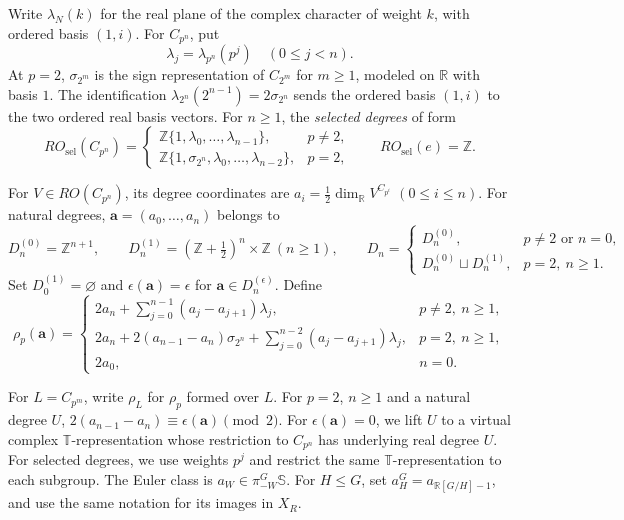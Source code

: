 Write $\lambda_N(k)$ for the real plane of the complex character
of weight $k$, with ordered basis $(1,i)$. For $C_{p^n}$, put
\[
\lambda_j=\lambda_{p^n}(p^j)\quad(0\le j<n).
\]
At $p=2$, $\sigma_{2^m}$ is the sign representation of $C_{2^m}$
for $m\ge1$, modeled on $\mathbb R$ with basis $1$.
The identification $\lambda_{2^n}(2^{n-1})=2\sigma_{2^n}$ sends
the ordered basis $(1,i)$ to the two ordered real basis vectors.
For $n\ge1$, the \emph{selected degrees} of \cite{ZhangHZ} form
\[
RO_{\mathrm{sel}}(C_{p^n})=
\begin{cases}
\mathbb Z\{1,\lambda_0,\ldots,\lambda_{n-1}\},&p\ne2,\\
\mathbb Z\{1,\sigma_{2^n},\lambda_0,\ldots,\lambda_{n-2}\},&p=2,
\end{cases}
\qquad RO_{\mathrm{sel}}(e)=\mathbb Z.
\]
\begin{definition}\label{def:degree-coordinates}
For $V\in RO(C_{p^n})$, its degree coordinates are
$a_i=\frac12\dim_{\mathbb R}V^{C_{p^i}}$ $(0\le i\le n)$.
For natural degrees, $\mathbf a=(a_0,\ldots,a_n)$ belongs to
\[
D_n^{(0)}=\mathbb Z^{n+1},\qquad
D_n^{(1)}=(\mathbb Z+\tfrac12)^n\times\mathbb Z\ (n\ge1),\qquad
D_n=\begin{cases}
D_n^{(0)},&p\ne2\text{ or }n=0,\\
D_n^{(0)}\sqcup D_n^{(1)},&p=2,\ n\ge1.
\end{cases}
\]
Set $D_0^{(1)}=\varnothing$ and $\epsilon(\mathbf a)=\epsilon$ for $\mathbf a\in D_n^{(\epsilon)}$.
Define
\begin{equation*}
\rho_p(\mathbf a)=\begin{cases}
2a_n+\displaystyle\sum_{j=0}^{n-1}(a_j-a_{j+1})\lambda_j,
   &p\ne2,\ n\ge1,\\
2a_n+2(a_{n-1}-a_n)\sigma_{2^n}
 +\displaystyle\sum_{j=0}^{n-2}(a_j-a_{j+1})\lambda_j,
   &p=2,\ n\ge1,\\
2a_0,&n=0.
\end{cases}
\end{equation*}
\end{definition}
For $L=C_{p^m}$, write $\rho_L$ for $\rho_p$ formed over $L$.
For $p=2$, $n\ge1$ and a natural degree $U$,
$2(a_{n-1}-a_n)\equiv\epsilon(\mathbf a)\pmod2$.
For $\epsilon(\mathbf a)=0$, we lift $U$ to a virtual complex
$\mathbb T$-representation whose restriction to $C_{p^n}$ has underlying
real degree $U$. For selected degrees, we use weights $p^j$ and restrict
the same $\mathbb T$-representation to each subgroup.
The Euler class is $a_W\in\pi_{-W}^G\mathbb S$. For $H\le G$, set
$a_H^G=a_{\mathbb R[G/H]-1}$, and use the same notation for its
images in $X_R$.

